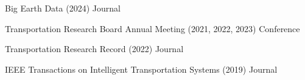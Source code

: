 

\begin{cvservices}
  \cvservice
    {Big Earth Data} %
    {(2024)} %
    {} %
    {Journal} %

  \cvservice
    {Transportation Research Board Annual Meeting} %
    {(2021, 2022, 2023)} %
    {} %
    {Conference} %

  \cvservice
    {Transportation Research Record} %
    {(2022)} %
    {} %
    {Journal} %

  \cvservice
    {IEEE Transactions on Intelligent Transportation Systems} %
    {(2019)} %
    {} %
    {Journal} %

\end{cvservices}

